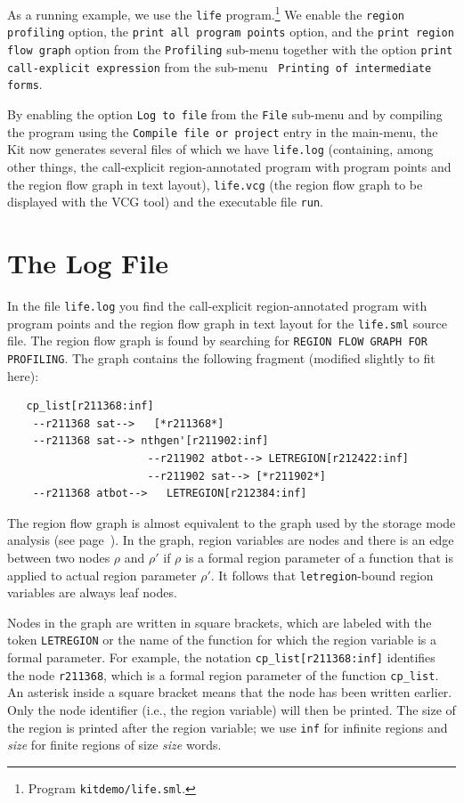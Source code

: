 \documentclass[12pt]{book}
\begin{document}
As a running example, we use the 
%
{\tt life} program.\footnote{Program {\tt kitdemo/life.sml}.}  We
enable the {\tt region profiling} option, the {\tt print all program points} option, and the {\tt print region flow
  graph} option from the {\tt Profiling}
sub-menu together with the option {\tt print call-explicit
  expression} from the sub-menu {\tt
  Printing of intermediate forms}.

By enabling the option {\tt Log to file} from the {\tt File} sub-menu
and by compiling the program using the {\tt Compile file or project} entry in
the main-menu, the Kit now generates several files of which we have
{\tt life.log} (containing, among other things, the call-explicit
region-annotated program with program points and the region flow graph
in text layout), {\tt life.vcg} (the region flow graph to be
displayed with the VCG tool) and the executable file {\tt run}.

\section{The Log File}
In the file {\tt life.log} you find the call-explicit region-annotated
program with program points and the region flow graph in text layout
for the {\tt life.sml} source file.  The region flow graph is found by
searching for \texttt{REGION FLOW GRAPH FOR PROFILING}. The graph
contains the following fragment (modified slightly to fit here):\label{reg_flow_graph.ex}
\begin{verbatim}
   cp_list[r211368:inf]
    --r211368 sat-->   [*r211368*]
    --r211368 sat--> nthgen'[r211902:inf]   
                      --r211902 atbot--> LETREGION[r212422:inf]
                      --r211902 sat--> [*r211902*]
    --r211368 atbot-->   LETREGION[r212384:inf]
\end{verbatim}
The region flow graph is almost equivalent to the graph used by the
storage mode analysis (see page~\pageref{region flow graph}). In the
graph, region variables are nodes and there is an edge between two nodes
$\rho$ and $\rho'$ if $\rho$ is a formal region parameter of a
function that is applied to actual region parameter $\rho'$. It
follows that \texttt{letregion}-bound region variables are always leaf
nodes.

Nodes in the graph are written in square brackets, which are labeled
with the token {\tt LETREGION} or the name of the function for which
the region variable is a formal parameter. For example, the notation
\texttt{cp\_list[r211368:inf]} identifies the node \texttt{r211368},
which is a formal region parameter of the function \texttt{cp\_list}.
An asterisk inside a square bracket means that the node has been
written earlier.  Only the node identifier (i.e., the region variable)
will then be printed. The size of the region is printed after the
region variable; we use {\tt inf} for infinite regions and {\em
  size\/} for finite regions of size {\em size\/} words.
\end{document}
